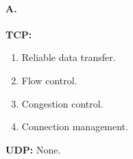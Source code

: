 \paragraph{A.}
\textbf{TCP:}
\begin{enumerate}
	\item Reliable data transfer.
	\item Flow control.
	\item Congestion control.
	\item Connection management.
\end{enumerate}

\textbf{UDP:}
None.